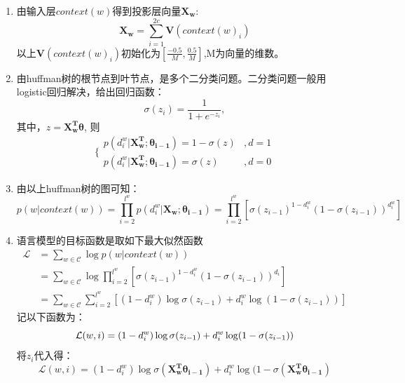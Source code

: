     \begin{enumerate}
        \item 由输入层$context(w)$得到投影层向量$\boldsymbol{X_w}$:
        \begin{equation}
            \boldsymbol{X_w} = \sum_{i=1}^{2c} \boldsymbol{V}(context(w)_i)
        \end{equation}
        以上$\boldsymbol{V}(context(w)_i)$初始化为$[\frac{-0.5}{M},\frac{0.5}{M}]$,M为向量的维数。
        \item 由huffman树的根节点到叶节点，是多个二分类问题。二分类问题一般用logistic回归解决，给出回归函数：
        \begin{equation}
            \sigma(z_i) = \frac{1}{1+e^{-z_i}},
        \end{equation} 
        其中，$z=\boldsymbol{X_w^T\theta}$, 
        则
        \begin{equation}
            \Bigg\{ 
                \begin{array} {ll}
                    p(d_i^w|\boldsymbol{X_w^T;\theta_{i-1}})=1-\sigma(z) &, d=1\\
                    p(d_i^w|\boldsymbol{X_w^T;\theta_{i-1}})=\sigma(z) &, d=0
                \end{array}
        \end{equation}

        \item 由以上huffman树的图可知：
        \begin{equation}
            p(w|context(w))=\prod_{i=2}^{l^w} p(d_i^w|\boldsymbol{X_w;\theta_{i-1}})=\prod_{i=2}^{l^w}[\sigma(z_{i-1})^{1-d_i^w}(1-\sigma(z_{i-1}))^{d_i^w}]
        \end{equation}
        \item 语言模型的目标函数是取如下最大似然函数
        \begin{equation}
            \begin{split}
                \mathcal{L}&=\sum_{w \in  \mathcal{C}} \log p(w|context(w))\\
                &=\sum_{w \in  \mathcal{C}} \log \prod_{i=2}^{l^w}[\sigma(z_{i-1})^{1-d_i^w}(1-\sigma(z_{i-1}))^{d_i}]\\
                &=\sum_{w \in  \mathcal{C}}\sum_{i=2}^{l^w}[(1-d_i^w)\log\sigma(z_{i-1})+d_i^w \log (1-\sigma(z_{i-1}))]
            \end{split}
        \end{equation}
        记以下函数为：
        \begin{equation}
            \mathcal{L}(w, i) = (1-d_i^w)\log\sigma(z_{i-1})+d_i^w \log (1-\sigma(z_{i-1})) \\
        \end{equation}
        将$z_i$代入得：
        \begin{equation}
            \mathcal{L}(w, i) = (1-d_i^w)\log\sigma(\boldsymbol{X_w^T\theta_{i-1}})+d_i^w \log (1-\sigma(\boldsymbol{X_w^T\theta_{i-1}})
        \end{equation}
        

\end{enumerate}
